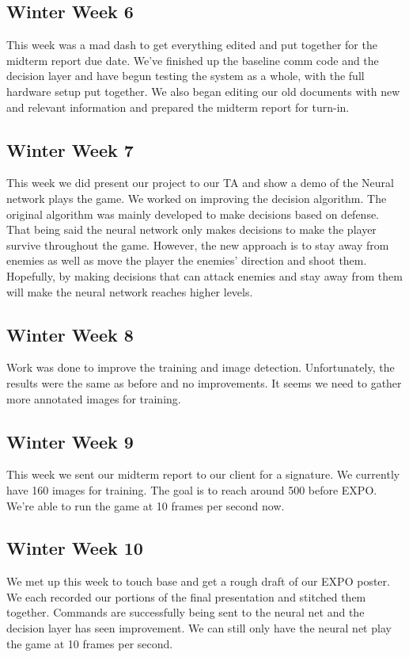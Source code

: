 \documentclass[onecolumn, draftclsnofoot,10pt, compsoc]{IEEEtran}
\begin{document}
\subsection{Winter Week 6}
This week was a mad dash to get everything edited and put together for the midterm report due date.
We've finished up the baseline comm code and the decision layer and have begun testing the system as a whole, with the full hardware setup put together.
We also began editing our old documents with new and relevant information and prepared the midterm report for turn-in.

\subsection{Winter Week 7}
This week we did present our project to our TA and show a demo of the Neural network plays the game.
We worked on improving the decision algorithm.
The original algorithm was mainly developed to make decisions based on defense.
That being said the neural network only makes decisions to make the player survive throughout the game.
However, the new approach is to stay away from enemies as well as move the player the enemies’ direction and shoot them.
Hopefully, by making decisions that can attack enemies and stay away from them will make the neural network reaches higher levels.

\subsection{Winter Week 8}
Work was done to improve the training and image detection.
Unfortunately, the results were the same as before and no improvements.
It seems we need to gather more annotated images for training.

\subsection{Winter Week 9}
This week we sent our midterm report to our client for a signature.
We currently have 160 images for training.
The goal is to reach around 500 before EXPO.
We're able to run the game at 10 frames per second now.

\subsection{Winter Week 10}
We met up this week to touch base and get a rough draft of our EXPO poster.
We each recorded our portions of the final presentation and stitched them together.
Commands are successfully being sent to the neural net and the decision layer has seen improvement.
We can still only have the neural net play the game at 10 frames per second.
\end{document}
